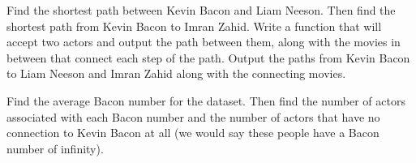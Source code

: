\begin{problem}
Find the shortest path between Kevin Bacon and Liam Neeson. Then find the shortest path from Kevin Bacon to Imran Zahid. Write a function that will accept two actors and output
the path between them, along with the movies in between that connect each step of the path. Output the paths from Kevin Bacon to Liam Neeson and Imran Zahid along with the connecting movies.
\end{problem}

\begin{problem}
Find the average Bacon number for the dataset. Then find the number of actors
associated with each Bacon number and the number of actors that have no connection
 to Kevin Bacon at all (we would say these people have a Bacon number of infinity).
\end{problem}

